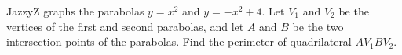 JazzyZ graphs the parabolas $y=x^2$ and $y=-x^2+4$. Let $V_1$ and $V_2$ be the vertices of the first and second parabolas, and let $A$ and $B$ be the two intersection points of the parabolas. Find the perimeter of quadrilateral $AV_1BV_2$.
